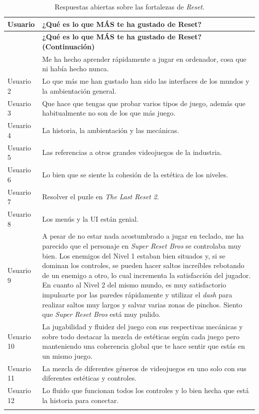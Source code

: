 \begin{longtable}{|l|p{13.5cm}|}
\hline
\textbf{Usuario} & \textbf{¿Qué es lo que MÁS te ha gustado de Reset?} \\ \hline
\end{firsthead}
\hline
\textbf{Usuario} & \textbf{¿Qué es lo que MÁS te ha gustado de Reset? (Continuación)} \\ \hline
\end{head}
\hline
\end{foot}
\hline
\end{lastfoot}
Usuario 1 & Me ha hecho aprender rápidamente a jugar en ordenador, cosa que ni había hecho nunca. \\ \hline
Usuario 2 & Lo que más me han gustado han sido las interfaces de los mundos y la ambientación general. \\ \hline
Usuario 3 & Que hace que tengas que probar varios tipos de juego, además que habitualmente no son de los que más juego. \\ \hline
Usuario 4 & La historia, la ambientación y las mecánicas. \\ \hline
Usuario 5 & Las referencias a otros grandes videojuegos de la industria. \\ \hline
Usuario 6 & Lo bien que se siente la cohesión de la estética de los niveles. \\ \hline
Usuario 7 & Resolver el puzle en \textit{The Last Reset 2}. \\ \hline
Usuario 8 & Los menús y la UI están genial. \\ \hline
Usuario 9 & A pesar de no estar nada acostumbrado a jugar en teclado, me ha parecido que el personaje en \textit{Super Reset Bros} se controlaba muy bien. Los enemigos del Nivel 1 estaban bien situados y, si se dominan los controles, se pueden hacer saltos increíbles rebotando de un enemigo a otro, lo cual incrementa la satisfacción del jugador. En cuanto al Nivel 2 del mismo mundo, es muy satisfactorio impulsarte por las paredes rápidamente y utilizar el \textit{dash} para realizar saltos muy largos y salvar varias zonas de pinchos. Siento que \textit{Super Reset Bros} está muy pulido. \\ \hline
Usuario 10 & La jugabilidad y fluidez del juego con sus respectivas mecánicas y sobre todo destacar la mezcla de estéticas según cada juego pero manteniendo una coherencia global que te hace sentir que estás en un mismo juego. \\ \hline
Usuario 11 & La mezcla de diferentes géneros de videojuegos en uno solo con sus diferentes estéticas y controles. \\ \hline
Usuario 12 & Lo fluido que funcionan todos los controles y lo bien hecha que está la historia para conectar. \\ \hline
\caption{Respuestas abiertas sobre las fortalezas de \textit{Reset}.}
\label{tab:comentarios_mas_gustado}
\end{longtable}

